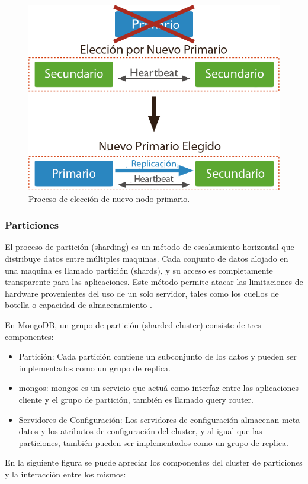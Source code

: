 \begin{figure}[H]
	\centering
		\includegraphics[width=.6\textwidth]{figures/failover}
	\caption{Proceso de elección de nuevo nodo primario.}
	\label{fig:failover}
\end{figure}


\subsubsection{Particiones}

El proceso de partición (sharding) es un método de escalamiento horizontal que distribuye datos entre múltiples maquinas.
Cada conjunto de datos alojado en una maquina es llamado partición (shards), y su acceso es completamente transparente
para las aplicaciones. Este método permite atacar las limitaciones de hardware provenientes del uso de un solo servidor, tales como
los cuellos de botella o capacidad de almacenamiento \cite{13}.

En MongoDB, un grupo de partición (sharded cluster) consiste de tres componentes:

\begin{itemize}
\item Partición: Cada partición contiene un subconjunto de los datos y pueden ser implementados como un grupo de replica.

\item mongos: mongos es un servicio que actuá como interfaz entre las aplicaciones cliente y el grupo de partición, también es llamado
query router.

\item Servidores de Configuración: Los servidores de configuración almacenan meta datos y los atributos de configuración del cluster, y
al igual que las particiones, también pueden ser implementados como un grupo de replica.
\end{itemize}

En la siguiente figura se puede apreciar los componentes del cluster de particiones y la interacción entre los mismos:

